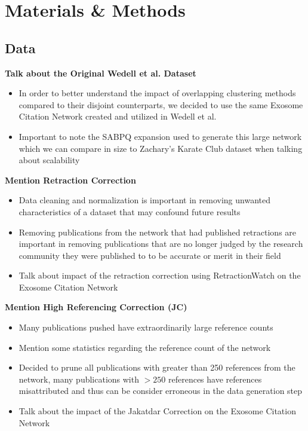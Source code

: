 \documentclass{article}
\begin{document}
\section{Materials \& Methods}
\subsection{Data}
\textbf{Talk about the Original Wedell et al. Dataset}
\begin{itemize}
	\item In order to better understand the impact of overlapping clustering methods compared to their disjoint counterparts, we decided to use the same Exosome Citation Network created and utilized in Wedell et al.
	\item Important to note the SABPQ expansion used to generate this large network which we can compare in size to Zachary's Karate Club dataset when talking about scalability
\end{itemize}

\textbf{Mention Retraction Correction}
\begin{itemize}
	\item Data cleaning and normalization is important in removing unwanted characteristics of a dataset that may confound future results
	\item Removing publications from the network that had published retractions are important in removing publications that are no longer judged by the research community they were published to to be accurate or merit in their field
	\item Talk about impact of the retraction correction using RetractionWatch on the Exosome Citation Network
\end{itemize}

\textbf{Mention High Referencing Correction (JC)}
\begin{itemize}
	\item Many publications pushed have extraordinarily large reference counts
	\item Mention some statistics regarding the reference count of the network
	\item Decided to prune all publications with greater than 250 references from the network, many publications with $>250$ references have references misattributed and thus can be consider erroneous in the data generation step
	\item Talk about the impact of the Jakatdar Correction on the Exosome Citation Network 
\end{itemize}
\end{document}
